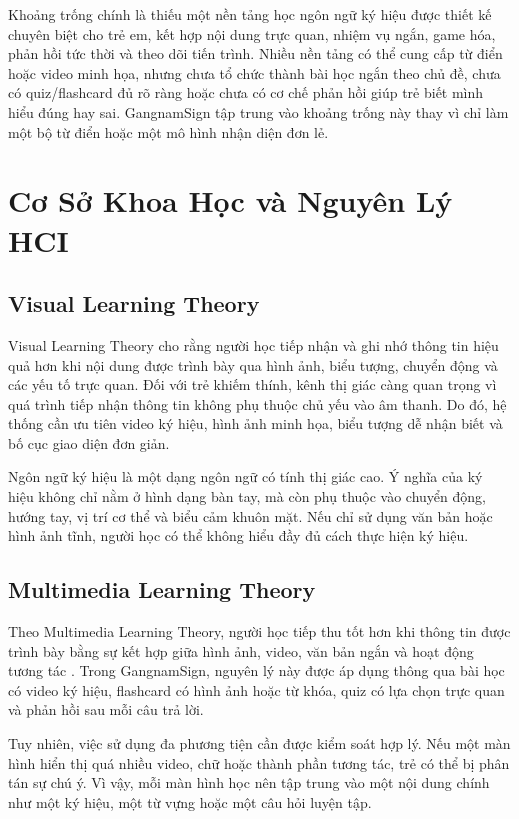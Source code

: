 \documentclass[conference]{IEEEtran}
\begin{document}
Khoảng trống chính là thiếu một nền tảng học ngôn ngữ ký hiệu được thiết kế chuyên biệt cho trẻ em, kết hợp nội dung trực quan, nhiệm vụ ngắn, game hóa, phản hồi tức thời và theo dõi tiến trình. Nhiều nền tảng có thể cung cấp từ điển hoặc video minh họa, nhưng chưa tổ chức thành bài học ngắn theo chủ đề, chưa có quiz/flashcard đủ rõ ràng hoặc chưa có cơ chế phản hồi giúp trẻ biết mình hiểu đúng hay sai. GangnamSign tập trung vào khoảng trống này thay vì chỉ làm một bộ từ điển hoặc một mô hình nhận diện đơn lẻ.

\section{Cơ Sở Khoa Học và Nguyên Lý HCI}
\subsection{Visual Learning Theory}
Visual Learning Theory cho rằng người học tiếp nhận và ghi nhớ thông tin hiệu quả hơn khi nội dung được trình bày qua hình ảnh, biểu tượng, chuyển động và các yếu tố trực quan. Đối với trẻ khiếm thính, kênh thị giác càng quan trọng vì quá trình tiếp nhận thông tin không phụ thuộc chủ yếu vào âm thanh. Do đó, hệ thống cần ưu tiên video ký hiệu, hình ảnh minh họa, biểu tượng dễ nhận biết và bố cục giao diện đơn giản.

Ngôn ngữ ký hiệu là một dạng ngôn ngữ có tính thị giác cao. Ý nghĩa của ký hiệu không chỉ nằm ở hình dạng bàn tay, mà còn phụ thuộc vào chuyển động, hướng tay, vị trí cơ thể và biểu cảm khuôn mặt. Nếu chỉ sử dụng văn bản hoặc hình ảnh tĩnh, người học có thể không hiểu đầy đủ cách thực hiện ký hiệu.

\subsection{Multimedia Learning Theory}
Theo Multimedia Learning Theory, người học tiếp thu tốt hơn khi thông tin được trình bày bằng sự kết hợp giữa hình ảnh, video, văn bản ngắn và hoạt động tương tác \cite{mayer}. Trong GangnamSign, nguyên lý này được áp dụng thông qua bài học có video ký hiệu, flashcard có hình ảnh hoặc từ khóa, quiz có lựa chọn trực quan và phản hồi sau mỗi câu trả lời.

Tuy nhiên, việc sử dụng đa phương tiện cần được kiểm soát hợp lý. Nếu một màn hình hiển thị quá nhiều video, chữ hoặc thành phần tương tác, trẻ có thể bị phân tán sự chú ý. Vì vậy, mỗi màn hình học nên tập trung vào một nội dung chính như một ký hiệu, một từ vựng hoặc một câu hỏi luyện tập.
\end{document}
